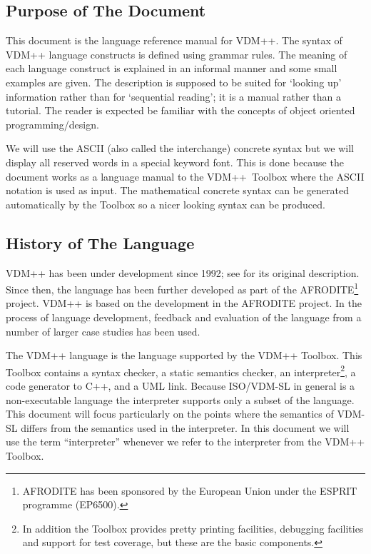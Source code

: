 \documentclass[\pformat,12pt]{article}
\newcommand{\vdmpp}{VDM++}
\begin{document}
\subsection{Purpose of The Document}

This document is the language reference manual for {\vdmpp}.  The
syntax of {\vdmpp} language constructs is defined using grammar rules.
The meaning of each language construct is explained in an informal
manner and some small examples are given. The description is supposed
to be suited for `looking up' information rather than for `sequential
reading'; it is a manual rather than a tutorial.  The reader is
expected be familiar with the concepts of object oriented
programming/design.

We will use the ASCII (also called the interchange)
concrete syntax but we will display all reserved words in a special
keyword font. This is done because the document works as a language
manual to the \vdmpp\ Toolbox where the ASCII notation is used as
input. The mathematical concrete syntax can be generated automatically
by the Toolbox so a nicer looking syntax can be produced.

\subsection{History of The Language}

{\vdmpp} has been under development since 1992; see \cite{Durr92a} for
its original description. Since then, the language has been further
developed as part of the AFRODITE\footnote{AFRODITE has been sponsored
by the European Union under the ESPRIT programme (EP6500).}
project. {\vdmpp} is based on the development in the AFRODITE
project.  In the process of language development, feedback and
evaluation of the language from a number of larger case studies has
been used.

The {\vdmpp} language is the language supported by the
{\vdmpp} Toolbox. This Toolbox contains a
syntax checker, a static semantics checker, an interpreter\footnote{In
addition the Toolbox provides pretty printing facilities, debugging
facilities and support for test coverage, but these are the basic
components.}, a code generator to C++, and a UML link.  Because
ISO/VDM-SL in general is a non-executable language the interpreter
supports only a subset of the language. This document will focus
particularly on the points where the semantics of VDM-SL differs from
the semantics used in the interpreter. In this document we will use
the term ``interpreter'' whenever we refer to the interpreter from the
{\vdmpp} Toolbox.
\end{document}
